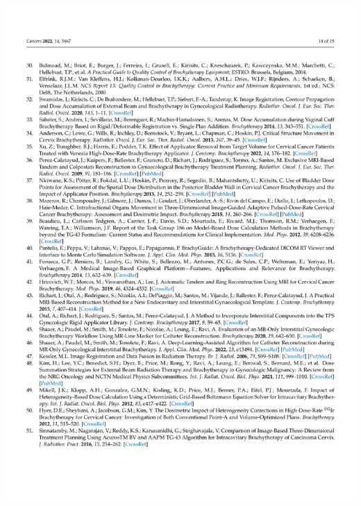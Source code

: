 \documentclass[
  a4paper,
]{scrreprt}
\begin{document}
\includegraphics{articulos/cancers/cancers-14.png}
\end{document}
